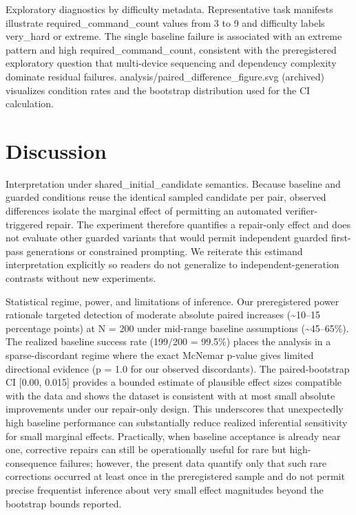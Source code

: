 \documentclass[conference]{IEEEtran}
\begin{document}
Exploratory diagnostics by difficulty metadata. Representative task manifests illustrate required\_command\_count values from 3 to 9 and difficulty labels very\_hard or extreme. The single baseline failure is associated with an extreme pattern and high required\_command\_count, consistent with the preregistered exploratory question that multi-device sequencing and dependency complexity dominate residual failures. analysis/paired\_difference\_figure.svg (archived) visualizes condition rates and the bootstrap distribution used for the CI calculation.

\section{Discussion}
Interpretation under shared\_initial\_candidate semantics. Because baseline and guarded conditions reuse the identical sampled candidate per pair, observed differences isolate the marginal effect of permitting an automated verifier-triggered repair. The experiment therefore quantifies a repair-only effect and does not evaluate other guarded variants that would permit independent guarded first-pass generations or constrained prompting. We reiterate this estimand interpretation explicitly so readers do not generalize to independent-generation contrasts without new experiments.

Statistical regime, power, and limitations of inference. Our preregistered power rationale targeted detection of moderate absolute paired increases (\textasciitilde{}10--15 percentage points) at N = 200 under mid-range baseline assumptions (\textasciitilde{}45--65\%). The realized baseline success rate (199/200 = 99.5\%) places the analysis in a sparse-discordant regime where the exact McNemar p-value gives limited directional evidence (p = 1.0 for our observed discordants). The paired-bootstrap CI [0.00, 0.015] provides a bounded estimate of plausible effect sizes compatible with the data and shows the dataset is consistent with at most small absolute improvements under our repair-only design. This underscores that unexpectedly high baseline performance can substantially reduce realized inferential sensitivity for small marginal effects. Practically, when baseline acceptance is already near one, corrective repairs can still be operationally useful for rare but high-consequence failures; however, the present data quantify only that such rare corrections occurred at least once in the preregistered sample and do not permit precise frequentist inference about very small effect magnitudes beyond the bootstrap bounds reported.
\end{document}
